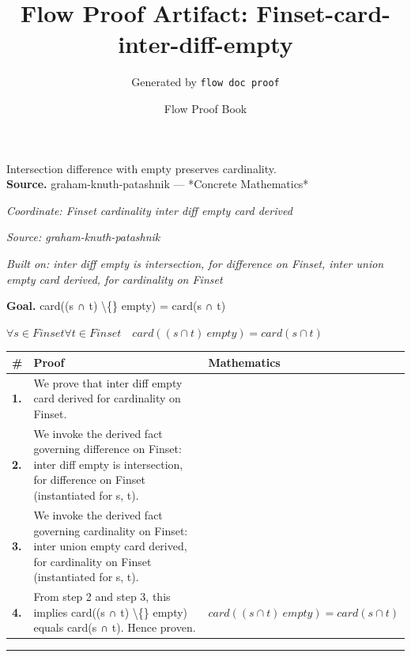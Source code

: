 \documentclass[11pt]{article}
\title{Flow Proof Artifact: Finset-card-inter-diff-empty}
\author{Generated by \texttt{flow doc proof}}
\date{Flow Proof Book}
\theoremstyle{definition}
\begin{document}
\maketitle
Intersection difference with empty preserves cardinality.\\[0.5em]
\textbf{Source.} graham-knuth-patashnik — *Concrete Mathematics*\\[0.5em]
\bigskip
{}\par
\smallskip\noindent\textit{Coordinate: Finset \cdot cardinality \cdot inter diff empty card derived}\par
\smallskip\noindent\textit{Source: graham-knuth-patashnik}\par
\smallskip\noindent\textit{Built on: inter diff empty is intersection, for difference on Finset, inter union empty card derived, for cardinality on Finset}\par
\medskip
\noindent\textbf{Goal.} card((s ∩ t) \textbackslash\{\} empty) = card(s ∩ t)\par
\noindent$\displaystyle \forall s \in Finset \forall t \in Finset\quad card((s ∩ t) \ empty) = card(s ∩ t)$\par
\medskip
\noindent
\begin{tabular}{@{} >{\raggedright\arraybackslash}p{} >{\raggedright\arraybackslash}p{} >{\raggedleft\arraybackslash}p{} @{}}
\textbf{\#} & \textbf{Proof} & \textbf{Mathematics} \\
\midrule
\textbf{1.} & We prove that inter diff empty card derived for cardinality on Finset. & \\[0.45em]
\textbf{2.} & We invoke the derived fact governing difference on Finset: inter diff empty is intersection, for difference on Finset (instantiated for s, t). & \\[0.45em]
\textbf{3.} & We invoke the derived fact governing cardinality on Finset: inter union empty card derived, for cardinality on Finset (instantiated for s, t). & \\[0.45em]
\textbf{4.} & From step 2 and step 3, this implies card((s ∩ t) \textbackslash\{\} empty) equals card(s ∩ t). Hence proven. & $\displaystyle card((s ∩ t) \ empty) = card(s ∩ t)$ \\[0.45em]
\bottomrule
\end{tabular}
\label{thm:Finset-cardinality-inter_diff_empty_card_derived}
\par\medskip\hrule
\end{document}
